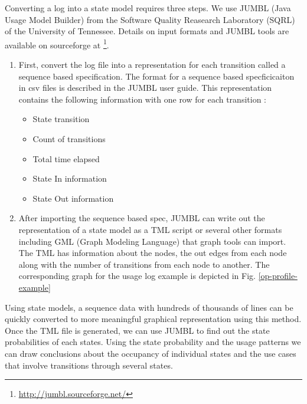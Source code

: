 Converting a log into a state model requires three steps.  We use JUMBL (Java Usage Model Builder) from the Software Quality Reasearch Laboratory (SQRL) of the University of Tennessee.    Details on input formats and JUMBL tools are available on sourceforge at \footnote{\url{http://jumbl.sourceforge.net/}}.
\begin{enumerate}
\item
First, convert the log file into a representation for each transition called a sequence based specification. The format for a sequence based specficicaiton in csv files is described in the JUMBL user guide. This representation contains the following information with one row for each transition :
\begin{itemize}
\item State transition
\item Count of transitions
\item Total time elapsed
\item State In information
\item State Out information
\end{itemize}

\item
After importing the sequence based spec, JUMBL can write out the representation of a state model as a TML script or several other formats including GML (Graph Modeling Language) that graph tools can import.  The TML  has information about the nodes, the out edges from each node along with the number of transitions from each node to another. The corresponding graph for the usage log example is depicted in Fig. \ref{op-profile-example}
\end{enumerate}


Using state models, a sequence data with hundreds of thousands of lines can be quickly converted to more meaningful graphical representation using this method. Once the TML file is generated, we can use JUMBL to find out the state probabilities of each states. Using the state probability and the usage patterns we can draw conclusions about the occupancy of individual states and the use cases that involve transitions through several states.



%
%
%
%
%
%
%
%
%



